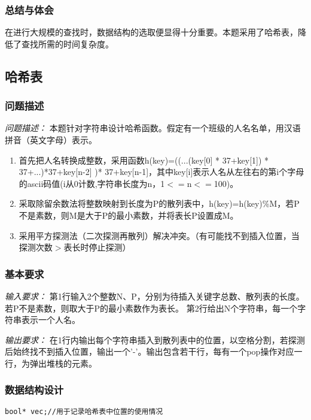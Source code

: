 \documentclass[a4paper,11pt]{article}%
\newenvironment{shadedquotation}
 {\begin{shaded*}
  \quoting[leftmargin=0pt, vskip=0pt]
 }
 {\endquoting
 \end{shaded*}
}
\begin{document}
\subsubsection{总结与体会}
在进行大规模的查找时，数据结构的选取便显得十分重要。本题采用了哈希表，降低了查找所需的时间复杂度。
\subsection{哈希表}
\subsubsection{问题描述}
\begin{shadedquotation}
    \emph{问题描述：}
    本题针对字符串设计哈希函数。假定有一个班级的人名名单，用汉语拼音（英文字母）表示。
    \begin{enumerate}
        \item 首先把人名转换成整数，采用函数h(key)=((...(key[0] * 37+key[1]) * 37+...)*37+key[n-2] )* 37+key[n-1]，其中key[i]表示人名从左往右的第i个字母的ascii码值(i从0计数,字符串长度为n，1$<=$n$<=$100)。
        \item 采取除留余数法将整数映射到长度为P的散列表中，h(key)=h(key)\%M，若P不是素数，则M是大于P的最小素数，并将表长P设置成M。
        \item 采用平方探测法（二次探测再散列）解决冲突。（有可能找不到插入位置，当探测次数$>$表长时停止探测）
    \end{enumerate}
\end{shadedquotation}
\subsubsection{基本要求}
\begin{shadedquotation}
    \emph{输入要求：}
第1行输入2个整数N、P，分别为待插入关键字总数、散列表的长度。若P不是素数，则取大于P的最小素数作为表长。
第2行给出N个字符串，每一个字符串表示一个人名。
\end{shadedquotation}
\begin{shadedquotation}
    \emph{输出要求：}
在1行内输出每个字符串插入到散列表中的位置，以空格分割，若探测后始终找不到插入位置，输出一个'-'。输出包含若干行，每有一个pop操作对应一行，为弹出堆栈的元素。
\end{shadedquotation}
\subsubsection{数据结构设计}
\begin{lstlisting}[language={[ANSI]C},keywordstyle=\color{blue!70},commentstyle=\color{red!50!green!50!blue!50},frame=shadowbox,
				rulesepcolor=\color{red!20!green!20!blue!20}]
bool* vec;//用于记录哈希表中位置的使用情况
\end{lstlisting}
\end{document}
